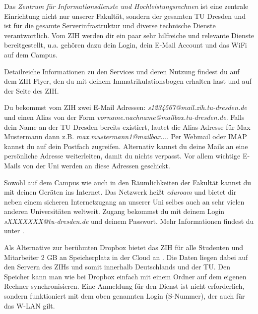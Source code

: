 

Das \textit{Zentrum für Informationsdienste und Hochleistungsrechnen} ist eine zentrale Einrichtung nicht nur unserer Fakultät, sondern der gesamten TU Dresden und ist für die gesamte Serverinfrastruktur und diverse technische Dienste verantwortlich. Vom ZIH werden dir ein paar sehr hilfreiche und relevante Dienste bereitgestellt, u.a. gehören dazu dein Login, dein E-Mail Account und das WiFi auf dem Campus.

Detailreiche Informationen zu den Services und deren Nutzung findest du auf dem ZIH Flyer, den du mit deinem Immatrikulationsbogen erhalten hast und auf der Seite des ZIH.

Du bekommst vom ZIH zwei E-Mail Adressen:
\textit{s1234567@mail.zih.tu-dresden.de} und einen Alias von der Form \textit{vorname.nachname@mailbox.tu-dresden.de}.
Falls dein Name an der TU Dresden bereits existiert, lautet die Alias-Adresse für Max Mustermann dann z.B. \textit{max.mustermann1@mailbox...}.
Per Webmail oder IMAP kannst du auf dein Postfach zugreifen.
Alternativ kannst du deine Mails an eine persönliche Adresse weiterleiten, damit du nichts verpasst.
Vor allem wichtige E-Mails von der Uni werden an diese Adressen geschickt.

Sowohl auf dem Campus wie auch in den Räumlichkeiten der Fakultät kannst du mit deinen Geräten ins Internet.
Das Netzwerk heißt \textit{eduroam} und bietet dir neben einem sicheren Internetzugang an unserer Uni selbes auch an sehr vielen anderen Universitäten weltweit. 
Zugang bekommst du mit deinem Login \textit{sXXXXXXX@tu-dresden.de} und deinem Passwort. Mehr Informationen findest du unter .

Als Alternative zur berühmten Dropbox bietet das ZIH für alle Studenten und Mitarbeiter 2 GB an Speicherplatz in der Cloud an . Die Daten liegen dabei auf den Servern des ZIHs und somit innerhalb Deutschlands und der TU. Den Speicher kann man wie bei Dropbox einfach mit einem Ordner auf dem eigenen Rechner synchronisieren. Eine Anmeldung für den Dienst ist nicht erforderlich, sondern funktioniert mit dem oben genannten Login (S-Nummer), der auch für das W-LAN gilt.

